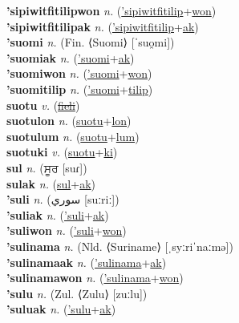 \textbf{'sipiwitfitilipwon} \textit{n.} (\hyperref['sipiwitfitilip]{'sipiwitfitilip}+\hyperref[won]{won})
 \label{'sipiwitfitilipwon} \\
\textbf{'sipiwitfitilipak} \textit{n.} (\hyperref['sipiwitfitilip]{'sipiwitfitilip}+\hyperref[ak]{ak})
 \label{'sipiwitfitilipak} \\
\textbf{'suomi} \textit{n.} (Fin. ⟨Suomi⟩ [ˈsuo̯mi])
 \label{'suomi} \\
\textbf{'suomiak} \textit{n.} (\hyperref['suomi]{'suomi}+\hyperref[ak]{ak})
 \label{'suomiak} \\
\textbf{'suomiwon} \textit{n.} (\hyperref['suomi]{'suomi}+\hyperref[won]{won})
 \label{'suomiwon} \\
\textbf{'suomitilip} \textit{n.} (\hyperref['suomi]{'suomi}+\hyperref[tilip]{tilip})
 \label{'suomitilip} \\
\textbf{suotu} \textit{v.} (\hyperref[fieli]{\sout{fieli}})
 \label{suotu} \\
\textbf{suotulon} \textit{n.} (\hyperref[suotu]{suotu}+\hyperref[lon]{lon})
 \label{suotulon} \\
\textbf{suotulum} \textit{n.} (\hyperref[suotu]{suotu}+\hyperref[lum]{lum})
 \label{suotulum} \\
\textbf{suotuki} \textit{v.} (\hyperref[suotu]{suotu}+\hyperref[ki]{ki})
 \label{suotuki} \\
\textbf{sul} \textit{n.} ({\gurmukhi{}ਸੂਰ} [suɾ])
 \label{sul} \\
\textbf{sulak} \textit{n.} (\hyperref[sul]{sul}+\hyperref[ak]{ak})
 \label{sulak} \\
\textbf{'suli} \textit{n.} ({\arabics{}سوري‎} [suːriː])
 \label{'suli} \\
\textbf{'suliak} \textit{n.} (\hyperref['suli]{'suli}+\hyperref[ak]{ak})
 \label{'suliak} \\
\textbf{'suliwon} \textit{n.} (\hyperref['suli]{'suli}+\hyperref[won]{won})
 \label{'suliwon} \\
\textbf{'sulinama} \textit{n.} (Nld. ⟨Suriname⟩ [ˌsyːriˈnaːmə])
 \label{'sulinama} \\
\textbf{'sulinamaak} \textit{n.} (\hyperref['sulinama]{'sulinama}+\hyperref[ak]{ak})
 \label{'sulinamaak} \\
\textbf{'sulinamawon} \textit{n.} (\hyperref['sulinama]{'sulinama}+\hyperref[won]{won})
 \label{'sulinamawon} \\
\textbf{'sulu} \textit{n.} (Zul. ⟨Zulu⟩ [zuːlu])
 \label{'sulu} \\
\textbf{'suluak} \textit{n.} (\hyperref['sulu]{'sulu}+\hyperref[ak]{ak})
